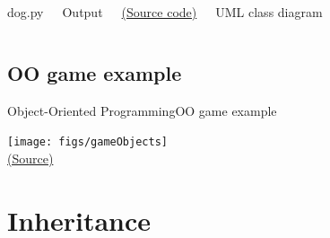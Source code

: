 \documentclass[10pt,compress]{beamer} %
\begin{document}
\begin{frame}[plain]%
    \vspace{-0.3cm}

    \begin{columns}
			\begin{exampleblock}{dog.py}
			\vspace{-0.3cm} 
				
			\end{exampleblock}

			\begin{exampleblock}{Output}
			\vspace{-0.3cm} 
				
			\end{exampleblock}

		\href{https://gist.github.com/dfbarrero/9b30c749986885373c8c250b3901ec9d}{(Source code)}

        \bigskip

        \pause

        \centering UML class diagram


    \end{columns}
\end{frame}

\subsection{OO game example}

\begin{frame}[plain]{Object-Oriented Programming}{OO game example}
	\begin{center}
    	\centering \texttt{[image: figs/gameObjects]}\\
		\smallskip
		\tiny{\href{http://blog.nuclex-games.com/2010/01/game-architecture-day-2/}{(Source)}}
	\end{center}
\end{frame}

\section{Inheritance}
\end{document}
